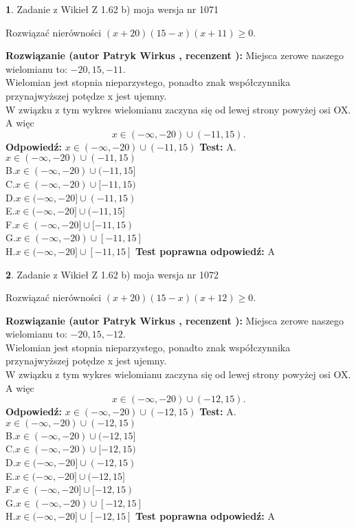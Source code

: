 \documentclass[12pt, a4paper]{article}
\theoremstyle{definition} %
\newtheorem{zad}{}
\newcommand{\zadStart}[1]{\begin{zad}#1\newline}
\newcommand{\zadStop}{\end{zad}}
\newcommand{\rozwStart}[2]{\noindent \textbf{Rozwiązanie (autor #1 , recenzent #2): }\newline}
\newcommand{\rozwStop}{\newline}
\newcommand{\odpStart}{\noindent \textbf{Odpowiedź:}\newline}
\newcommand{\odpStop}{\newline}
\newcommand{\testStart}{\noindent \textbf{Test:}\newline}
\newcommand{\testStop}{\newline}
\newcommand{\kluczStart}{\noindent \textbf{Test poprawna odpowiedź:}\newline}
\newcommand{\kluczStop}{\newline}
\begin{document}
\zadStart{Zadanie z Wikieł Z 1.62 b) moja wersja nr 1071}

Rozwiązać nierówności $(x+20)(15-x)(x+11)\ge0$.
\zadStop
\rozwStart{Patryk Wirkus}{}
Miejsca zerowe naszego wielomianu to: $-20, 15, -11$.\\
Wielomian jest stopnia nieparzystego, ponadto znak współczynnika przy\linebreak najwyższej potędze x jest ujemny.\\ W związku z tym wykres wielomianu zaczyna się od lewej strony powyżej osi OX. A więc $$x \in (-\infty,-20) \cup (-11,15).$$
\rozwStop
\odpStart
$x \in (-\infty,-20) \cup (-11,15)$
\odpStop
\testStart
A.$x \in (-\infty,-20) \cup (-11,15)$\\
B.$x \in (-\infty,-20) \cup (-11,15]$\\
C.$x \in (-\infty,-20) \cup [-11,15)$\\
D.$x \in (-\infty,-20] \cup (-11,15)$\\
E.$x \in (-\infty,-20] \cup (-11,15]$\\
F.$x \in (-\infty,-20] \cup [-11,15)$\\
G.$x \in (-\infty,-20) \cup [-11,15]$\\
H.$x \in (-\infty,-20] \cup [-11,15]$
\testStop
\kluczStart
A
\kluczStop



\zadStart{Zadanie z Wikieł Z 1.62 b) moja wersja nr 1072}

Rozwiązać nierówności $(x+20)(15-x)(x+12)\ge0$.
\zadStop
\rozwStart{Patryk Wirkus}{}
Miejsca zerowe naszego wielomianu to: $-20, 15, -12$.\\
Wielomian jest stopnia nieparzystego, ponadto znak współczynnika przy\linebreak najwyższej potędze x jest ujemny.\\ W związku z tym wykres wielomianu zaczyna się od lewej strony powyżej osi OX. A więc $$x \in (-\infty,-20) \cup (-12,15).$$
\rozwStop
\odpStart
$x \in (-\infty,-20) \cup (-12,15)$
\odpStop
\testStart
A.$x \in (-\infty,-20) \cup (-12,15)$\\
B.$x \in (-\infty,-20) \cup (-12,15]$\\
C.$x \in (-\infty,-20) \cup [-12,15)$\\
D.$x \in (-\infty,-20] \cup (-12,15)$\\
E.$x \in (-\infty,-20] \cup (-12,15]$\\
F.$x \in (-\infty,-20] \cup [-12,15)$\\
G.$x \in (-\infty,-20) \cup [-12,15]$\\
H.$x \in (-\infty,-20] \cup [-12,15]$
\testStop
\kluczStart
A
\kluczStop
\end{document}
